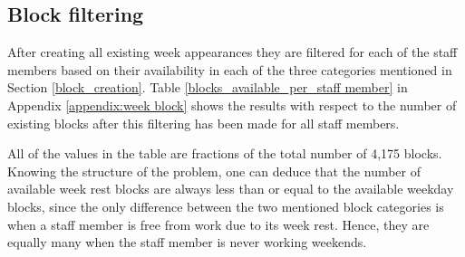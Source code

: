 \subsection{Block filtering}
After creating all existing week appearances they are filtered for each of the staff members based on their availability in each of the three categories mentioned in Section \ref{block_creation}. Table \ref{blocks_available_per_staff member} in Appendix \ref{appendix:week block} shows the results with respect to the number of existing blocks after this filtering has been made for all staff members.


All of the values in the table are fractions of the total number of 4,175 blocks. Knowing the structure of the problem, one can deduce that the number of available week rest blocks are always less than or equal to the available weekday blocks, since the only difference between the two mentioned block categories is when a staff member is free from work due to its week rest. Hence, they are equally many when the staff member is never working weekends.
